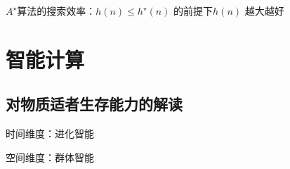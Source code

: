 \begin{notation}
    $A^\star$算法的搜索效率：$h\left( n \right) \le h^\star\left( n \right) $ 的前提下$h\left( n \right) $ 越大越好
\end{notation}
\section{智能计算}%
\label{sec:智能计算}
\subsection{对物质适者生存能力的解读}%
\label{sub:对物质适者生存能力的解读}
时间维度：进化智能

空间维度：群体智能

